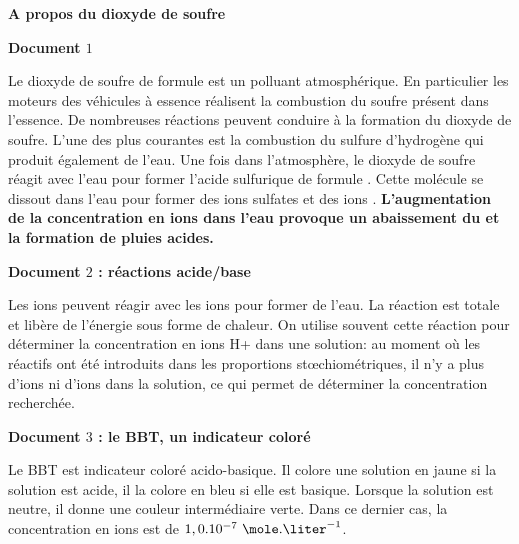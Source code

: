 \exo \textbf{A propos du dioxyde de soufre}

\vspace{0.3cm}

\textbf{Document $1$}

\vspace{0.3cm}

Le dioxyde de soufre de formule  est un polluant atmosphérique. En particulier les moteurs des véhicules à essence réalisent la combustion du soufre présent dans l'essence.
De nombreuses réactions peuvent conduire à la formation du dioxyde de soufre. L'une des plus
courantes est la combustion du sulfure d'hydrogène  qui produit également de l'eau.
Une fois dans l'atmosphère, le dioxyde de soufre réagit avec l'eau pour former l'acide sulfurique de formule . Cette molécule se dissout dans l'eau pour former des ions sulfates  et des ions .\newline
\textbf{L'augmentation de la concentration en ions  dans l'eau provoque un abaissement du  et la formation de pluies acides.}

\vspace{0.3cm}

\textbf{Document $2$ : réactions acide/base}

\vspace{0.3cm}

Les ions  peuvent réagir avec les ions  pour former de l'eau. La réaction est totale et libère de l'énergie sous forme de chaleur. On utilise souvent cette réaction pour déterminer la concentration en ions H+ dans une solution: au moment où les réactifs ont été introduits dans les proportions stœchiométriques, il n'y a plus d'ions  ni d'ions  dans la solution, ce qui permet de déterminer la concentration recherchée.


\newpage

\textbf{Document $3$ : le BBT, un indicateur coloré}

\vspace{0.3cm}

Le BBT est indicateur coloré acido-basique. Il colore une solution en jaune si la solution est acide, il la colore en bleu si elle est basique. Lorsque la solution est neutre, il donne une couleur intermédiaire verte. Dans ce dernier cas, la concentration en ions  est de $1,0 . 10^{-7}\text{ }\mole.\liter^{-1}$.

